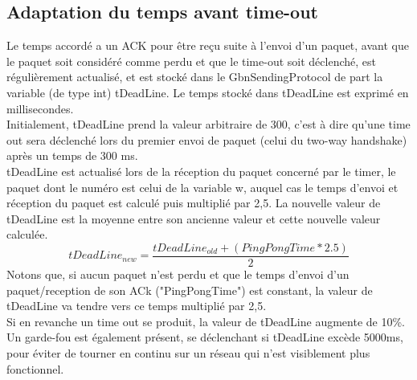 \documentclass[11pt]{article}
\begin{document}
\subsection{Adaptation du temps avant time-out}
Le temps accordé a un ACK pour être reçu suite à l'envoi d'un paquet, avant que le paquet soit considéré comme perdu et que le time-out soit déclenché, est régulièrement actualisé, et est stocké dans le GbnSendingProtocol de part la variable (de type int) tDeadLine. Le temps stocké dans tDeadLine est exprimé en millisecondes.\\
Initialement, tDeadLine prend la valeur arbitraire de 300, c'est à dire qu'une time out sera déclenché lors du premier envoi de paquet (celui du two-way handshake) après un temps de 300 ms.\\
tDeadLine est actualisé lors de la réception du paquet concerné par le timer, le paquet dont le numéro est celui de la variable w, auquel cas le temps d'envoi et réception du paquet est calculé puis multiplié par 2,5. La nouvelle valeur de tDeadLine est la moyenne entre son ancienne valeur et cette nouvelle valeur calculée. 
\[
   tDeadLine_{new} = \frac{tDeadLine_{old} + (PingPongTime * 2.5)}{2}
\]
Notons que, si aucun paquet n'est perdu et que le temps d'envoi d'un paquet/reception de son ACk ("PingPongTime") est constant, la valeur de tDeadLine va tendre vers ce temps multiplié par 2,5. \\
Si en revanche un time out se produit, la valeur de tDeadLine augmente de 10\%. Un garde-fou est également présent, se déclenchant si tDeadLine excède 5000ms, pour éviter de tourner en continu sur un réseau qui n'est visiblement plus fonctionnel.
\end{document}
